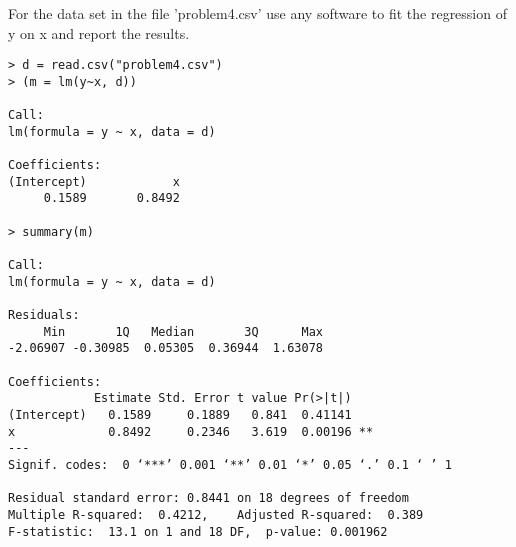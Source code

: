 \item For the data set in the file 'problem4.csv' use any software to fit the 
regression of y on x and report the results.



\begin{verbatim}
> d = read.csv("problem4.csv")
> (m = lm(y~x, d))

Call:
lm(formula = y ~ x, data = d)

Coefficients:
(Intercept)            x  
     0.1589       0.8492  

> summary(m)

Call:
lm(formula = y ~ x, data = d)

Residuals:
     Min       1Q   Median       3Q      Max 
-2.06907 -0.30985  0.05305  0.36944  1.63078 

Coefficients:
            Estimate Std. Error t value Pr(>|t|)   
(Intercept)   0.1589     0.1889   0.841  0.41141   
x             0.8492     0.2346   3.619  0.00196 **
---
Signif. codes:  0 ‘***’ 0.001 ‘**’ 0.01 ‘*’ 0.05 ‘.’ 0.1 ‘ ’ 1

Residual standard error: 0.8441 on 18 degrees of freedom
Multiple R-squared:  0.4212,	Adjusted R-squared:  0.389 
F-statistic:  13.1 on 1 and 18 DF,  p-value: 0.001962
\end{verbatim}
